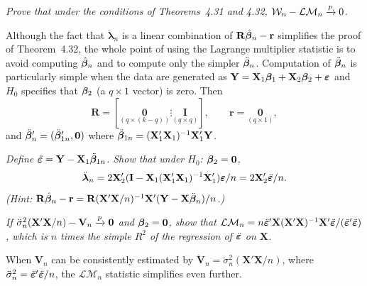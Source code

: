 \begin{exercises}
\item\label{ex:4.33} \textit{Prove that under the conditions of Theorems~4.31 and 4.32, $\mathcal{W}_n - \mathcal{LM}_n \xrightarrow{p} 0$.}
\end{exercises}

Although the fact that $\ddot{\boldsymbol{\lambda}}_n$ is a linear combination of $\mathbf{R}\hat{\boldsymbol{\beta}}_n - \mathbf{r}$ simplifies the
proof of Theorem~4.32, the whole point of using the Lagrange multiplier
statistic is to avoid computing $\hat{\boldsymbol{\beta}}_n$ and to compute only the simpler $\ddot{\boldsymbol{\beta}}_n$.
Computation of $\ddot{\boldsymbol{\beta}}_n$ is particularly simple when the data are generated as
$\mathbf{Y} = \mathbf{X}_1\boldsymbol{\beta}_1 + \mathbf{X}_2\boldsymbol{\beta}_2 + \boldsymbol{\varepsilon}$ and $H_0$ specifies that $\boldsymbol{\beta}_2$ (a $q \times 1$ vector) is zero.
Then
\[
\mathbf{R} = [\underset{(q\times(k-q))}{\mathbf{0}} \vdots \underset{(q\times q)}{\mathbf{I}}], \qquad \mathbf{r} = \underset{(q\times 1)}{\mathbf{0}},
\]
and $\ddot{\boldsymbol{\beta}}_n' = (\ddot{\boldsymbol{\beta}}_{1n}', \mathbf{0})$ where $\ddot{\boldsymbol{\beta}}_{1n} = (\mathbf{X}_1'\mathbf{X}_1)^{-1}\mathbf{X}_1'\mathbf{Y}$.

\begin{exercises}
\item\label{ex:4.34} \textit{Define $\ddot{\boldsymbol{\varepsilon}} = \mathbf{Y} - \mathbf{X}_1\ddot{\boldsymbol{\beta}}_{1n}$. Show that under $H_0$: $\boldsymbol{\beta}_2 = \mathbf{0}$,}
\[
\ddot{\boldsymbol{\lambda}}_n = 2\mathbf{X}_2'(\mathbf{I} - \mathbf{X}_1(\mathbf{X}_1'\mathbf{X}_1)^{-1}\mathbf{X}_1')\boldsymbol{\varepsilon}/n = 2\mathbf{X}_2'\ddot{\boldsymbol{\varepsilon}}/n.
\]
\emph{(Hint: $\mathbf{R}\hat{\boldsymbol{\beta}}_n - \mathbf{r} = \mathbf{R}(\mathbf{X}'\mathbf{X}/n)^{-1}\mathbf{X}'(\mathbf{Y} - \mathbf{X}\ddot{\boldsymbol{\beta}}_n)/n$.)}

\item\label{ex:4.35} \textit{If $\ddot{\sigma}_n^2(\mathbf{X}'\mathbf{X}/n) - \mathbf{V}_n \xrightarrow{p} \mathbf{0}$ and $\boldsymbol{\beta}_2 = \mathbf{0}$, show that $\mathcal{LM}_n = n\ddot{\boldsymbol{\varepsilon}}'\mathbf{X}(\mathbf{X}'\mathbf{X})^{-1}\mathbf{X}'\ddot{\boldsymbol{\varepsilon}}/(\ddot{\boldsymbol{\varepsilon}}'\ddot{\boldsymbol{\varepsilon}})$, which is $n$ times the simple $R^2$ of the regression of $\ddot{\boldsymbol{\varepsilon}}$ on $\mathbf{X}$.}
\end{exercises}

When $\mathbf{V}_n$ can be consistently estimated by $\ddot{\mathbf{V}}_n = \ddot{\sigma}_n^2(\mathbf{X}'\mathbf{X}/n)$, where $\ddot{\sigma}_n^2 = \ddot{\boldsymbol{\varepsilon}}'\ddot{\boldsymbol{\varepsilon}}/n$, the $\mathcal{LM}_n$ statistic simplifies even further.

